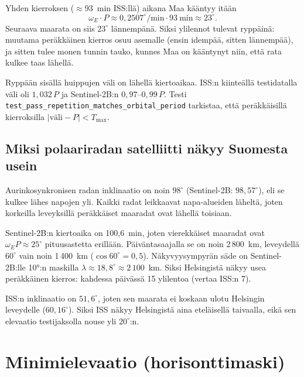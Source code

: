 \documentclass[a4paper,11pt]{article}
\newcommand{\koodi}[1]{\texttt{#1}}
\begin{document}
Yhden kierroksen ($\approx 93$~min ISS:llä) aikana Maa kääntyy itään
\[
\omega_E \cdot P \approx 0,2507^\circ/\text{min}\cdot 93\ \text{min} \approx 23^\circ.
\]
Seuraava maarata on siis $23^\circ$ lännempänä. Siksi ylilennot tulevat ryppäinä: muutama peräkkäinen kierros osuu asemalle (ensin idempää, sitten lännempää), ja sitten tulee monen tunnin tauko, kunnes Maa on kääntynyt niin, että rata kulkee taas lähellä.

Ryppään sisällä huippujen väli on lähellä kiertoaikaa. ISS:n kiinteällä testidatalla väli oli $1,032\,P$ ja Sentinel-2B:n $0,97$–$0,99\,P$. Testi \koodi{test\_pass\_repetition\_matches\_orbital\_period} tarkistaa, että peräkkäisillä kierroksilla $|\text{väli} - P| < T_\text{max}$.

\subsection{Miksi polaariradan satelliitti näkyy Suomesta usein}

Aurinkosynkronisen radan inklinaatio on noin $98^\circ$ (Sentinel-2B: $98,57^\circ$), eli se kulkee lähes napojen yli. Kaikki radat leikkaavat napa-alueiden läheltä, joten korkeilla leveyksillä peräkkäiset maaradat ovat lähellä toisiaan.

Sentinel-2B:n kiertoaika on 100,6~min, joten vierekkäiset maaradat ovat $\omega_E P \approx 25^\circ$ pituusastetta erillään. Päiväntasaajalla se on noin 2\,800~km, leveydellä $60^\circ$ vain noin 1\,400~km ($\cos 60^\circ = 0,5$). Näkyvyysympyrän säde on Sentinel-2B:lle 10°:n maskilla $\lambda \approx 18,8^\circ \approx 2\,100$~km. Siksi Helsingistä näkyy usea peräkkäinen kierros: kahdessa päivässä 15 ylilentoa (vertaa ISS:n 7).

ISS:n inklinaatio on $51,6^\circ$, joten sen maarata ei koskaan ulotu Helsingin leveydelle ($60,16^\circ$). Siksi ISS näkyy Helsingistä aina eteläisellä taivaalla, eikä sen elevaatio testijaksolla nouse yli $20^\circ$:n.

\section{Minimielevaatio (horisonttimaski)}
\end{document}
